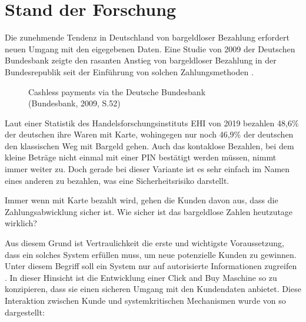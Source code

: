 \section{Stand der Forschung}


Die zunehmende Tendenz in Deutschland von bargeldloser Bezahlung erfordert neuen Umgang mit den 
eigegebenen Daten. Eine Studie von 2009 der Deutschen Bundesbank zeigte den rasanten Anstieg von 
bargeldloser Bezahlung in der Bundesrepublik seit der Einführung von solchen Zahlungsmethoden 
\cite{refrep:DBCP}.

\begin{figure}[htb]
    \caption{Cashless payments via the Deutsche Bundesbank\\ (Bundesbank, 2009, S.52)}
    \label{fig:refrep_DB}
\end{figure}


Laut einer Statistik des Handelsforschungsinstituts EHI von 2019 \cite{refart:KSDL} bezahlen 48,6\% 
der deutschen ihre Waren mit Karte, wohingegen nur noch 46,9\% der deutschen den klassischen 
Weg mit Bargeld gehen. Auch das kontaklose Bezahlen, bei dem kleine Beträge nicht einmal mit einer 
PIN bestätigt werden müssen, nimmt immer weiter zu. Doch gerade bei dieser Variante ist es sehr einfach
im Namen eines anderen zu bezahlen, was eine Sicherheitsrisiko darstellt.


Immer wenn mit Karte bezahlt wird, gehen die Kunden davon aus, dass die Zahlungsabwicklung sicher ist. 
Wie sicher ist das bargeldlose Zahlen heutzutage wirklich? 


Aus diesem Grund ist Vertraulichkeit die erste und wichtigste Voraussetzung, dass ein solches System 
erfüllen muss, um neue potenzielle Kunden zu gewinnen. Unter diesem Begriff soll ein System nur auf 
autorisierte Informationen zugreifen \cite{refbook:SWIS}. In dieser Hinsicht ist die Entwicklung 
einer Click and Buy Maschine so zu konzipieren, dass sie einen sicheren Umgang mit den Kundendaten
anbietet. Diese Interaktion zwischen Kunde und systemkritischen Mechanismen wurde von 
\cite{refart:HARE} so dargestellt:

